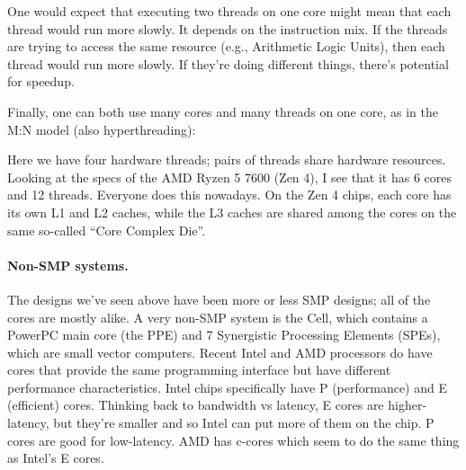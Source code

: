 One would expect that executing two threads on one core might
mean that each thread would run more slowly. It depends on the instruction
mix. If the threads are trying to access the same resource (e.g., Arithmetic Logic Units), then each
thread would run more slowly. If they're doing different things, there's 
potential for speedup.

Finally, one can both use many cores and many threads
on one core, as in the M:N model (also hyperthreading):

\begin{center}
\end{center}
Here we have four hardware threads; pairs of threads share hardware
resources. Looking at the specs of the AMD Ryzen 5 7600 (Zen 4), I see that it has
6 cores and 12 threads. Everyone does this nowadays.
On the Zen 4 chips, each core has its own L1 and L2 caches, while the L3 caches are
shared among the cores on the same so-called ``Core Complex Die''.

\paragraph{Non-SMP systems.} The designs we've seen above have been
more or less SMP designs; all of the cores are mostly alike.
A very non-SMP system is the Cell, which contains a PowerPC main core
(the PPE) and 7 Synergistic Processing Elements (SPEs), which are
small vector computers.
Recent Intel and AMD processors do have cores that provide the same
programming interface but have different performance characteristics.
Intel chips specifically have P (performance) and E (efficient) cores.
Thinking back to bandwidth vs latency, E cores are higher-latency, but
they're smaller and so Intel can put more of them on the chip. P cores are
good for low-latency. AMD has c-cores which seem to do the same thing as Intel's E cores.

